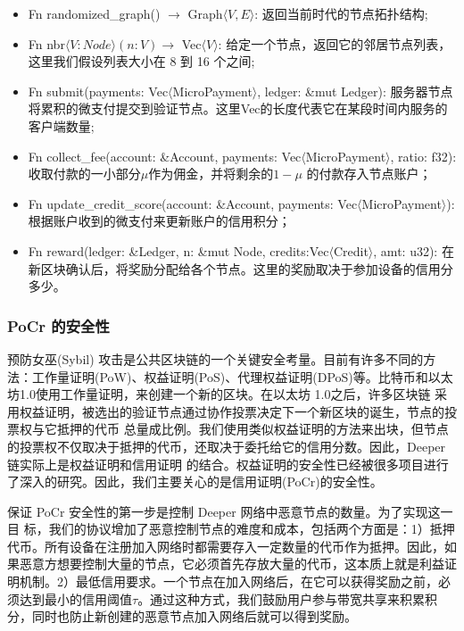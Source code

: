 \documentclass[a4paper]{article}
\begin{document}
\begin{itemize}
    \item Fn randomized\_graph() $\rightarrow$ Graph$\langle V,E \rangle$: 返回当前时代的节点拓扑结构;
    \item Fn nbr$\langle V:Node \rangle (n: V) \rightarrow$ Vec$\langle V \rangle$: 给定一个节点，返回它的邻居节点列表，这里我们假设列表大小在 8 到 16 个之间;
    \item Fn submit(payments: Vec$\langle$MicroPayment$\rangle$, ledger: \&mut Ledger): 服务器节点将累积的微支付提交到验证节点。这里Vec的长度代表它在某段时间内服务的客户端数量;
    \item Fn collect\_fee(account: \&Account, payments: Vec$\langle$MicroPayment$\rangle$, ratio: f32): 收取付款的一小部分$\mu$作为佣金，并将剩余的$1-\mu$ 的付款存入节点账户；
    \item Fn update\_credit\_score(account: \&Account, payments: Vec$\langle$MicroPayment$\rangle$): 根据账户收到的微支付来更新账户的信用积分；
    \item Fn reward(ledger: \&Ledger, n: \&mut Node,  credits:Vec$\langle$Credit$\rangle$, amt: u32): 在新区块确认后，将奖励分配给各个节点。这里的奖励取决于参加设备的信用分多少。
\end{itemize}

\subsubsection{PoCr 的安全性}
预防女巫(Sybil) 攻击是公共区块链的一个关键安全考量。目前有许多不同的方法：工作量证明(PoW)、权益证明(PoS)、代理权益证明(DPoS)等。比特币和以太坊1.0使用工作量证明，来创建一个新的区块。在以太坊 1.0之后，许多区块链
采用权益证明，被选出的验证节点通过协作投票决定下一个新区块的诞生，节点的投票权与它抵押的代币
总量成比例。我们使用类似权益证明的方法来出块，但节点的投票权不仅取决于抵押的代币，还取决于委托给它的信用分数。因此，Deeper链实际上是权益证明和信用证明
的结合。权益证明的安全性已经被很多项目进行了深入的研究。因此，我们主要关心的是信用证明(PoCr)的安全性。

保证 PoCr 安全性的第一步是控制 Deeper 网络中恶意节点的数量。为了实现这一目
标，我们的协议增加了恶意控制节点的难度和成本，包括两个方面是：1）抵押代币。所有设备在注册加入网络时都需要存入一定数量的代币作为抵押。因此，如果恶意方想要控制大量的节点，它必须首先存放大量的代币，这本质上就是利益证明机制。2）最低信用要求。一个节点在加入网络后，在它可以获得奖励之前，必须达到最小的信用阈值$\tau$。通过这种方式，我们鼓励用户参与带宽共享来积累积分，同时也防止新创建的恶意节点加入网络后就可以得到奖励。
\end{document}
